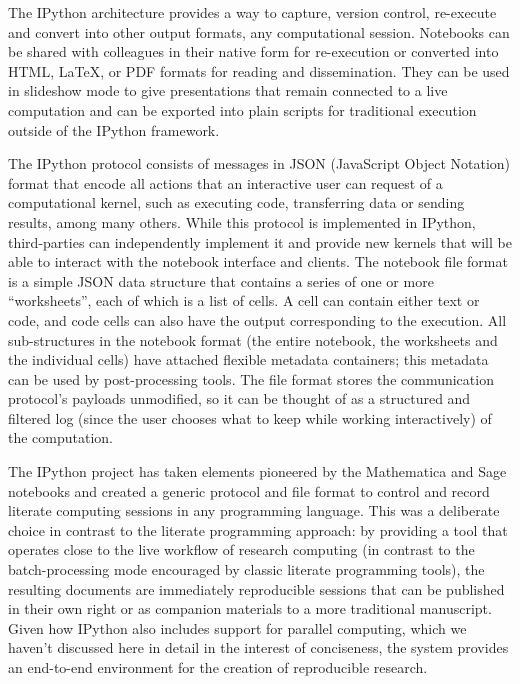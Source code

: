 \documentclass[ChapterTOCs,krantz2]{krantz} %
\theoremstyle{definition}
\begin{document}
The IPython architecture provides a way to capture, version control, re-execute
and convert into other output formats, any computational session.  Notebooks
can be shared with colleagues in their native form for re-execution or
converted into HTML, \LaTeX, or PDF formats for reading and dissemination.  They
can be used in slideshow mode to give presentations that remain connected to a
live computation and can be exported into plain scripts for traditional
execution outside of the IPython framework.

The IPython protocol consists of messages in JSON (JavaScript Object Notation)
format that encode all actions that an interactive user can request of a
computational kernel, such as executing code, transferring data or sending
results, among many others.  While this protocol is implemented in IPython,
third-parties can independently implement it and provide new kernels that will
be able to interact with the notebook interface and clients.  The notebook file
format is a simple JSON data structure that contains a series of one or more
``worksheets'', each of which is a list of cells.  A cell can contain either
text or code, and code cells can also have the output corresponding to the
execution.  All sub-structures in the notebook format (the entire notebook, the
worksheets and the individual cells) have attached flexible metadata
containers; this metadata can be used by post-processing tools.  The file
format stores the communication protocol's payloads unmodified, so it can be
thought of as a structured and filtered log (since the user chooses what to
keep while working interactively) of the computation.  

The IPython project has taken elements pioneered by the Mathematica and Sage
notebooks and created a generic protocol and file format to control and record
literate computing sessions in any programming language.  This was a deliberate
choice in contrast to the literate programming approach: by providing a tool
that operates close to the live workflow of research computing (in contrast to
the batch-processing mode encouraged by classic literate programming tools),
the resulting documents are immediately reproducible sessions that can be
published in their own right or as companion materials to a more traditional
manuscript.  Given how IPython also includes support for parallel computing,
which we haven't discussed here in detail in the interest of conciseness, the
system provides an end-to-end environment for the creation of reproducible
research.
\end{document}
